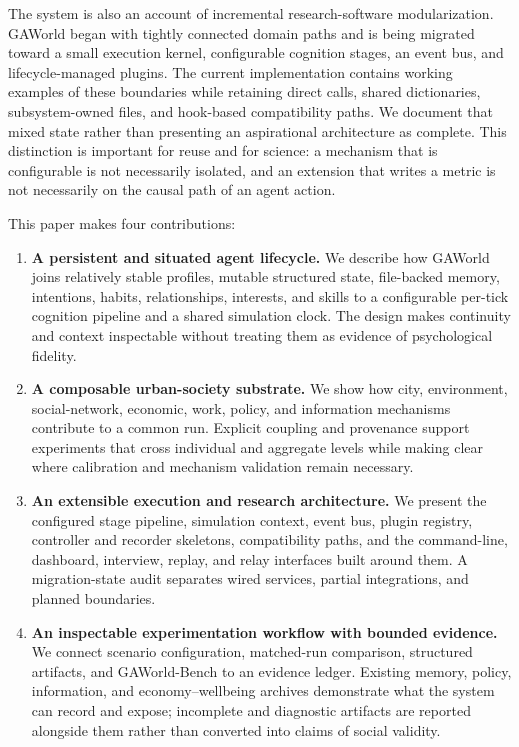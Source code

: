 The system is also an account of incremental research-software
modularization.  GAWorld began with tightly connected domain paths and is being
migrated toward a small execution kernel, configurable cognition stages, an
event bus, and lifecycle-managed plugins.  The current implementation contains
working examples of these boundaries while retaining direct calls, shared
dictionaries, subsystem-owned files, and hook-based compatibility paths.  We
document that mixed state rather than presenting an aspirational architecture
as complete.  This distinction is important for reuse and for science: a
mechanism that is configurable is not necessarily isolated, and an extension
that writes a metric is not necessarily on the causal path of an agent action.

This paper makes four contributions:

\begin{enumerate}[leftmargin=*]
  \item \textbf{A persistent and situated agent lifecycle.}  We describe how
  GAWorld joins relatively stable profiles, mutable structured state,
  file-backed memory, intentions, habits, relationships, interests, and skills
  to a configurable per-tick cognition pipeline and a shared simulation clock.
  The design makes continuity and context inspectable without treating them as
  evidence of psychological fidelity.

  \item \textbf{A composable urban-society substrate.}  We show how city,
  environment, social-network, economic, work, policy, and information
  mechanisms contribute to a common run.  Explicit coupling and provenance
  support experiments that cross individual and aggregate levels while making
  clear where calibration and mechanism validation remain necessary.

  \item \textbf{An extensible execution and research architecture.}  We
  present the configured stage pipeline, simulation context, event bus, plugin
  registry, controller and recorder skeletons, compatibility paths, and the
  command-line, dashboard, interview, replay, and relay interfaces built around
  them.  A migration-state audit separates wired services, partial
  integrations, and planned boundaries.

  \item \textbf{An inspectable experimentation workflow with bounded evidence.}
  We connect scenario configuration, matched-run comparison, structured
  artifacts, and GAWorld-Bench to an evidence ledger.  Existing memory,
  policy, information, and economy--wellbeing archives demonstrate what the
  system can record and expose; incomplete and diagnostic artifacts are
  reported alongside them rather than converted into claims of social
  validity.
\end{enumerate}

